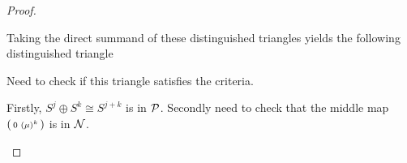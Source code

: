 \begin{proof}
\begin{enumerate}
{            Taking the direct summand of these distinguished triangles yields the following distinguished triangle
            \begin{center}
            \end{center}
            Need to check if this triangle satisfies the criteria.
            
            Firstly, \( S^j \oplus S^k \cong S^{j + k} \) is in \( {\mathcal{P}} \). Secondly need to check that the middle map 
            \( 
                \begin{psmallmatrix}
                    0 & ( \mu )^k
                \end{psmallmatrix} 
            \)
            is in \( {\mathcal{N}} \).

}
\end{enumerate}
\end{proof}
